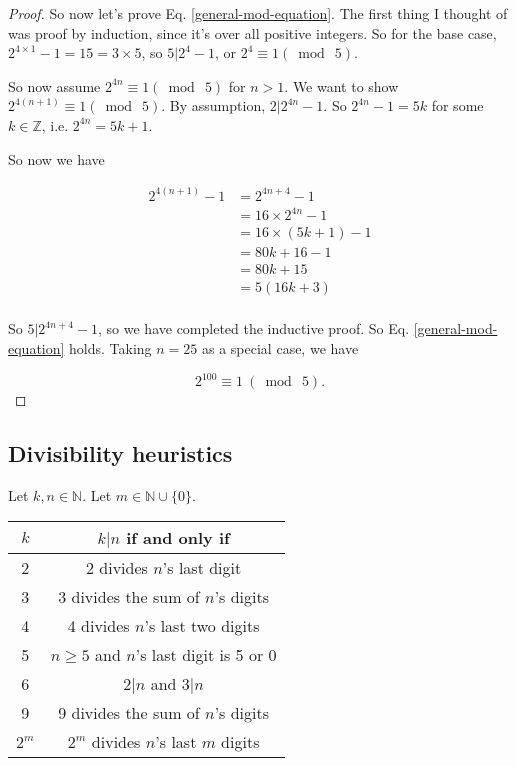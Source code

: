 \documentclass{article}
\theoremstyle{definition}
\begin{document}
\begin{proof}
So now let's prove Eq. \ref{general-mod-equation}. The first thing I thought of was proof by induction, since it's over all positive integers. So for the base case, $2^{4 \times 1} - 1 = 15 = 3 \times 5$, so $5 | 2^4 -1$, or $2^4 \equiv 1 (\bmod \ 5)$.

So now assume $2^{4n} \equiv 1 (\bmod \ 5)$ for $n > 1$. We want to show $2^{4(n+1)} \equiv 1 (\bmod \ 5)$. By assumption, $2 | 2^{4n}-1$. So $2^{4n}-1 = 5k$ for some $k \in \mathbb{Z}$, i.e. $2^{4n} = 5k + 1$.

So now we have

\begin{align*}
2^{4(n+1)} - 1 & = 2^{4n+4} - 1 \\
& = 16 \times 2^{4n} - 1 \\
& = 16 \times (5k+1) - 1 \\
& = 80k + 16 -1 \\
& = 80k + 15 \\
& = 5(16k + 3) \\
\end{align*}

So $5 | 2^{4n+4} - 1$, so we have completed the inductive proof. So Eq. \ref{general-mod-equation} holds. Taking $n = 25$ as a special case, we have

\begin{equation*}
2^{100} \equiv 1 \ (\bmod \ 5).
\end{equation*}
\end{proof}

\subsection{Divisibility heuristics}

Let $k, n \in \mathbb{N}$. Let $m \in \mathbb{N} \cup \{0\}$.

\begin{center}
\begin{tabular}{|c|c|}
\hline
$k$ & $k | n$ if and only if \\
\hline
2 & 2 divides $n$'s last digit \\
3 & 3 divides the sum of $n$'s digits \\
4 & 4 divides $n$'s last two digits \\
5 & $n \geq 5$ and $n$'s last digit is 5 or 0 \\
6 & $2|n$ and $3|n$ \\
9 & 9 divides the sum of $n$'s digits \\
$2^m$ & $2^m$ divides $n$'s last $m$ digits \\
\hline
\end{tabular}
\end{center}
\end{document}
